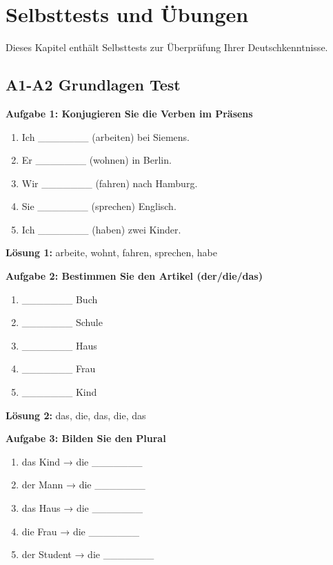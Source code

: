 \chapter{Selbsttests und Übungen}
\label{cha:Tests}

Dieses Kapitel enthält Selbsttests zur Überprüfung Ihrer Deutschkenntnisse.

\section{A1-A2 Grundlagen Test}

\bigskip
\noindent\textbf{Aufgabe 1: Konjugieren Sie die Verben im Präsens}

\begin{enumerate}
    \item Ich \_\_\_\_\_\_\_ (arbeiten) bei Siemens.
    \item Er \_\_\_\_\_\_\_ (wohnen) in Berlin.
    \item Wir \_\_\_\_\_\_\_ (fahren) nach Hamburg.
    \item Sie \_\_\_\_\_\_\_ (sprechen) Englisch.
    \item Ich \_\_\_\_\_\_\_ (haben) zwei Kinder.
\end{enumerate}

\bigskip
\textbf{Lösung 1:} arbeite, wohnt, fahren, sprechen, habe

\bigskip
\noindent\textbf{Aufgabe 2: Bestimmen Sie den Artikel (der/die/das)}

\begin{enumerate}
    \item \_\_\_\_\_\_\_ Buch
    \item \_\_\_\_\_\_\_ Schule
    \item \_\_\_\_\_\_\_ Haus
    \item \_\_\_\_\_\_\_ Frau
    \item \_\_\_\_\_\_\_ Kind
\end{enumerate}

\bigskip
\textbf{Lösung 2:} das, die, das, die, das

\bigskip
\noindent\textbf{Aufgabe 3: Bilden Sie den Plural}

\begin{enumerate}
    \item das Kind → die \_\_\_\_\_\_\_
    \item der Mann → die \_\_\_\_\_\_\_
    \item das Haus → die \_\_\_\_\_\_\_
    \item die Frau → die \_\_\_\_\_\_\_
    \item der Student → die \_\_\_\_\_\_\_
\end{enumerate}

